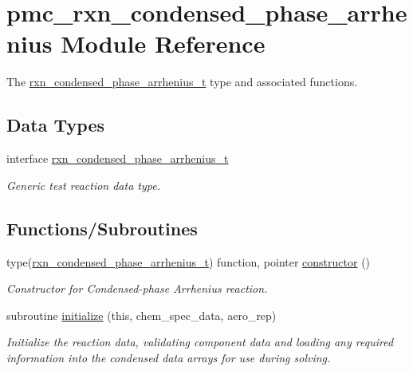 \hypertarget{namespacepmc__rxn__condensed__phase__arrhenius}{}\section{pmc\+\_\+rxn\+\_\+condensed\+\_\+phase\+\_\+arrhenius Module Reference}
\label{namespacepmc__rxn__condensed__phase__arrhenius}


The \mbox{\hyperlink{structpmc__rxn__condensed__phase__arrhenius_1_1rxn__condensed__phase__arrhenius__t}{rxn\+\_\+condensed\+\_\+phase\+\_\+arrhenius\+\_\+t}} type and associated functions.  


\subsection*{Data Types}
\begin{DoxyCompactItemize}
\item 
interface \mbox{\hyperlink{structpmc__rxn__condensed__phase__arrhenius_1_1rxn__condensed__phase__arrhenius__t}{rxn\+\_\+condensed\+\_\+phase\+\_\+arrhenius\+\_\+t}}
\begin{DoxyCompactList}\small\item\em Generic test reaction data type. \end{DoxyCompactList}\end{DoxyCompactItemize}
\subsection*{Functions/\+Subroutines}
\begin{DoxyCompactItemize}
\item 
type(\mbox{\hyperlink{structpmc__rxn__condensed__phase__arrhenius_1_1rxn__condensed__phase__arrhenius__t}{rxn\+\_\+condensed\+\_\+phase\+\_\+arrhenius\+\_\+t}}) function, pointer \mbox{\hyperlink{namespacepmc__rxn__condensed__phase__arrhenius_a86fca966cbac239128e1c8182d9435ac}{constructor}} ()
\begin{DoxyCompactList}\small\item\em Constructor for Condensed-\/phase Arrhenius reaction. \end{DoxyCompactList}\item 
subroutine \mbox{\hyperlink{namespacepmc__rxn__condensed__phase__arrhenius_a8a116287a43f4018bb5896f88b55d0d6}{initialize}} (this, chem\+\_\+spec\+\_\+data, aero\+\_\+rep)
\begin{DoxyCompactList}\small\item\em Initialize the reaction data, validating component data and loading any required information into the condensed data arrays for use during solving. \end{DoxyCompactList}\end{DoxyCompactItemize}


